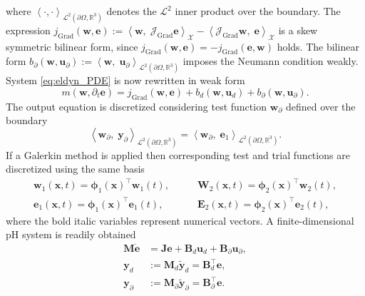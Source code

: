 \documentclass{svjour3}                     %
\DeclareMathOperator*{\Grad}{Grad}
\begin{document}
where $\left\langle \cdot,  \cdot \right\rangle_{\mathscr{L}^2(\partial \Omega, \mathbb{R}^3)}$ denotes the $\mathscr{L}^2$ inner product over the boundary. The expression $j_{\Grad}(\bm{w}, \bm{e}) :=\left\langle \bm{w}, \; \bm{\mathcal{J}}_{\Grad} \bm{e} \right\rangle_{\mathscr{X}} - \left\langle \bm{\mathcal{J}}_{\Grad} \bm{w}, \; \bm{e} \right\rangle_{\mathscr{X}}$ is a skew symmetric bilinear form, since $j_{\Grad}(\bm{w}, \bm{e})=-j_{\Grad}(\bm{e},\bm{w})$ holds. The bilinear form $b_{\partial}(\bm{w}, \bm{u}_\partial) := \left\langle \bm{w}, \; \bm{u}_\partial \right\rangle_{\mathscr{L}^2(\partial \Omega, \mathbb{R}^3)}$ imposes the Neumann condition weakly. System \eqref{eq:eldyn_PDE} is now rewritten in weak form
\begin{equation}
m(\bm{w}, \partial_t \bm{e}) = j_{\Grad}(\bm{w}, \bm{e}) + b_d(\bm{w}, \bm{u}_d) + b_{\partial}(\bm{w}, \bm{u}_\partial).
\end{equation}
The output equation is discretized considering test function $\bm{w}_\partial$ defined over the boundary
\begin{equation}
\left\langle \bm{w}_\partial, \; \bm{y}_\partial \right\rangle_{\mathscr{L}^2(\partial \Omega, \mathbb{R}^3)} = \left\langle \bm{w}_\partial, \; \bm{e}_1 \right\rangle_{\mathscr{L}^2(\partial \Omega, \mathbb{R}^3)}.
\end{equation}
If a Galerkin method is applied then corresponding test and trial functions are discretized using the same basis
\begin{equation*}
\begin{aligned}
\bm{w}_1(\bm{x},t) = \bm{\phi}_1(\bm{x})^\top \mathbf{w}_1(t), \\
\bm{e}_1(\bm{x},t) = \bm{\phi}_1(\bm{x})^\top \mathbf{e}_1(t), 
\end{aligned} \qquad
\begin{aligned}
\bm{W}_2(\bm{x},t) = \bm{\phi}_2(\bm{x})^\top \mathbf{w}_2(t), \\
\bm{E}_2(\bm{x},t) = \bm{\phi}_2(\bm{x})^\top \mathbf{e}_2(t),
\end{aligned}
\end{equation*}
where the bold italic variables represent numerical vectors. A finite-dimensional pH system is readily obtained
\begin{equation}
\begin{aligned}
\mathbf{M} \dot{\mathbf{e}} &= \mathbf{J} \mathbf{e} + \mathbf{B}_d \mathbf{u}_d + \mathbf{B}_\partial \mathbf{u}_\partial, \\
\mathbf{y}_d &:= \mathbf{M}_d \widetilde{\mathbf{y}}_d = \mathbf{B}_d^\top \mathbf{e},  \\
\mathbf{y}_\partial &:= \mathbf{M}_\partial \widetilde{\mathbf{y}}_\partial = \mathbf{B}_\partial^\top \mathbf{e}.
\end{aligned}
\end{equation}
\end{document}
